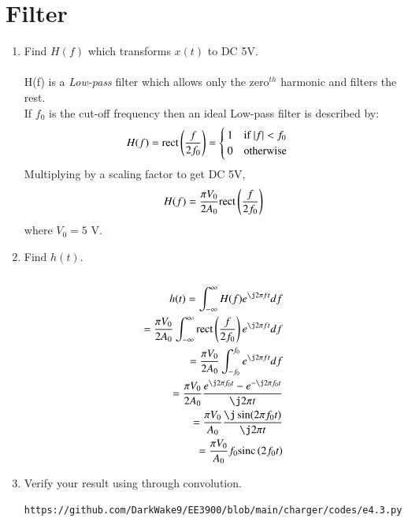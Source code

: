 \documentclass[journal,12pt,twocolumn]{IEEEtran}
\renewcommand\thesection{\arabic{section}}
\begin{document}
\section{Filter}
\begin{enumerate}[label=\thesection.\arabic*
,ref=\thesection.\theenumi]
\item Find $H(f)$ which transforms $x(t)$ to DC 5V.\\
\solution\\
H(f) is a \textit{Low-pass} filter which allows only the zero$^{th}$ harmonic and filters the rest.\\

If $f_0$ is the cut-off frequency then an ideal Low-pass filter is described by:
\begin{equation}
	H(f) = \rect{\frac{f}{2f_0}} = \begin{cases}
		1 \quad $if $ \abs{f} < f_0\\
		0 \quad $otherwise$
	\end{cases}
\end{equation}
Multiplying by a scaling factor to get DC 5V,
\begin{equation}
	H(f) = \frac{\pi V_0}{2A_0}\text{rect}\left(\frac{f}{2f_0}\right)
		\label{eq:Hf}
\end{equation}
where $V_0 = 5$ V.
\item Find $h(t)$.\\
\solution\\
\begin{align}
	h(t) = \int_{-\infty}^{\infty} H(f)e^{\j2\pi f t}df\\
	= \frac{\pi V_0}{2A_0} \int_{-\infty}^{\infty}\rect{\frac{f}{2f_0}} e^{\j2\pi f t}df\\
	= \frac{\pi V_0}{2A_0} \int_{-f_0}^{f_0} e^{\j2\pi f t}df\\
	= \frac{\pi V_0}{2A_0} \dfrac{e^{\j2\pi f_0 t} - e^{-\j2\pi f_0 t}}{\j2\pi t}\\
	= \frac{\pi V_0}{A_0} \dfrac{\j\sin(2\pi f_0 t)}{\j2\pi t}\\
	= \frac{\pi V_0}{A_0} f_0\sinc{2f_0 t}
\end{align}
\item Verify your result using  through convolution.
\solution
\begin{lstlisting}
https://github.com/DarkWake9/EE3900/blob/main/charger/codes/e4.3.py
\end{lstlisting}
\begin{figure}[!ht]
	\begin{center}

\end{center}
\end{figure}
\end{enumerate}
\end{document}
